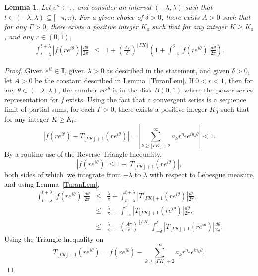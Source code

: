 \documentclass[11pt,a4paper]{article}
\newcommand{\T}{\mathbb{T}}
\def\sub{\subseteq}
\def\lpar{\left(}
\def\rpar{\right)}
\def\sub{\subseteq}
\newtheorem{lemma}[theorem]{Lemma}
\begin{document}
\begin{lemma}\label{NTuranLem} Let $e^{it}\in\T$, and consider an interval $(-\lambda,\lambda)$ such that\linebreak $t\in(-\lambda,\lambda)\sub[-\pi,\pi)$.  For a given choice of $\delta>0$, there exists $A>0$ such that for any $\Gamma>0$, there exists a positive integer $K_0$ such that for any integer $K\geq K_0$, and any $r\in(0,1)$,
\begin{eqnarray}
    \int_{t-\lambda}^{t+\lambda}\left|f(re^{i\theta})\right|\frac{d\theta}{2\pi} &\leq&1+\left(\frac{A\pi}{\delta}\right)^{\lfloor\Gamma K\rfloor}\lpar1+\int_{-\delta}^{\delta} \left|f(re^{i\theta})\right| \frac{d\theta}{2\pi}\rpar. \label{TuranPartial3}
\end{eqnarray}
\end{lemma}
\begin{proof}  Given $e^{it}\in\T$, given $\lambda>0$ as described in the statement, and given $\delta>0$, let $A>0$ be the constant described in Lemma~\ref{TuranLem}. If $0<r<1$, then for any $\theta\in(-\lambda,\lambda)$, the number $re^{i\theta}$ is in the disk $B(0,1)$ where the power series representation for $f$ exists. Using the fact that a convergent series is a sequence limit of partial sums, for each $\Gamma>0$, there exists a positive integer $K_0$ such that for any integer $K\geq K_0$, 
\[\left|f(re^{i\theta})-T_{\lfloor\Gamma K\rfloor+1}(re^{i\theta})\right|=\left|\sum_{k\geq \lfloor\Gamma K\rfloor +2}^\infty a_kr^{n_k}e^{in_k\theta}\right|<1.
\]
By a routine use of the Reverse Triangle Inequality, \[\left|f(re^{i\theta})\right|\leq 1+ |T_{\lfloor\Gamma K\rfloor+1}(re^{i\theta})|,\] both sides of which, we integrate from $-\lambda$ to $\lambda$ with respect to Lebesgue measure, and using Lemma~\ref{TuranLem},
\begin{eqnarray}
    \int_{t-\lambda}^{t+\lambda}\left|f(re^{i\theta})\right|\frac{d\theta}{2\pi} &\leq& \frac{\lambda}{\pi}+\int_{t-\lambda}^{t+\lambda} |T_{\lfloor\Gamma K\rfloor+1}(re^{i\theta})|\frac{d\theta}{2\pi},\nonumber\\
    &\leq  & \frac{\lambda}{\pi}+\int_{-\pi}^{\pi} |T_{\lfloor\Gamma K\rfloor+1}(re^{i\theta})|\frac{d\theta}{2\pi},\nonumber\\
    &\leq&\frac{\lambda}{\pi}+\left(\frac{A\pi}{\delta}\right)^{\lfloor\Gamma K\rfloor} \int_{-\delta}^{\delta} |T_{\lfloor\Gamma K\rfloor+1}(re^{i\theta})| \frac{d\theta}{2\pi}.\label{TuranPartial}
\end{eqnarray} Using the Triangle Inequality on \[ T_{\lfloor\Gamma K\rfloor+1}(re^{i\theta})=f(re^{i\theta})-\sum_{k\geq \lfloor\Gamma K\rfloor +2}^\infty a_kr^{n_k}e^{in_k\theta},\]

\end{proof}
\end{document}
